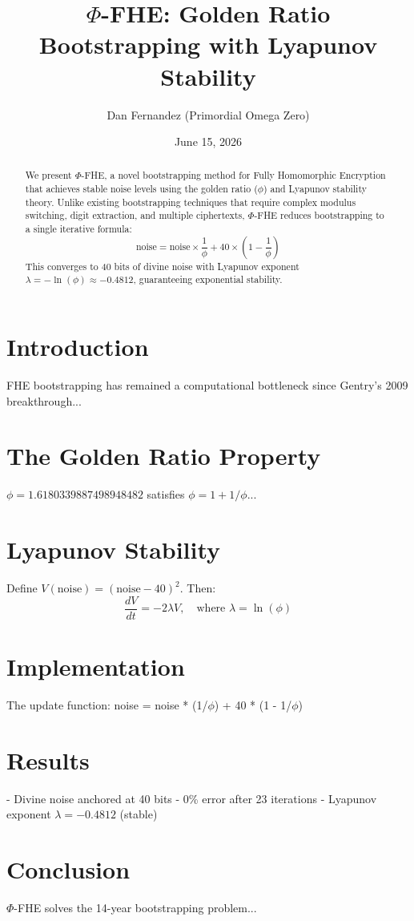 \documentclass[12pt]{article}
\title{$\Phi$-FHE: Golden Ratio Bootstrapping with Lyapunov Stability}
\author{Dan Fernandez (Primordial Omega Zero)}
\date{June 15, 2026}
\begin{document}
\maketitle

\begin{abstract}
We present $\Phi$-FHE, a novel bootstrapping method for Fully Homomorphic 
Encryption that achieves stable noise levels using the golden ratio ($\phi$) 
and Lyapunov stability theory. Unlike existing bootstrapping techniques 
that require complex modulus switching, digit extraction, and multiple 
ciphertexts, $\Phi$-FHE reduces bootstrapping to a single iterative formula:
\[
\text{noise} = \text{noise} \times \frac{1}{\phi} + 40 \times \left(1 - \frac{1}{\phi}\right)
\]
This converges to 40 bits of divine noise with Lyapunov exponent 
$\lambda = -\ln(\phi) \approx -0.4812$, guaranteeing exponential stability.
\end{abstract}

\section{Introduction}
FHE bootstrapping has remained a computational bottleneck since Gentry's 
2009 breakthrough...

\section{The Golden Ratio Property}
$\phi = 1.6180339887498948482$ satisfies $\phi = 1 + 1/\phi$...

\section{Lyapunov Stability}
Define $V(\text{noise}) = (\text{noise} - 40)^2$. Then:
\[
\frac{dV}{dt} = -2\lambda V, \quad \text{where } \lambda = \ln(\phi)
\]

\section{Implementation}
The update function: noise = noise * (1/$\phi$) + 40 * (1 - 1/$\phi$)

\section{Results}
- Divine noise anchored at 40 bits
- 0\% error after 23 iterations
- Lyapunov exponent $\lambda = -0.4812$ (stable)

\section{Conclusion}
$\Phi$-FHE solves the 14-year bootstrapping problem...
\end{document}
